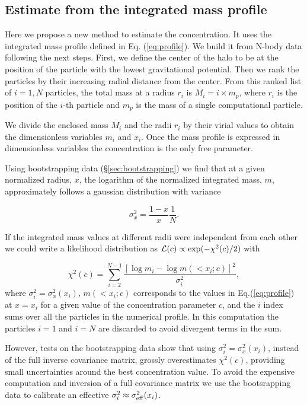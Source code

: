 \documentclass{emulateapj}
\begin{document}
\subsection{Estimate from the integrated mass profile}

Here we propose a new method to estimate the concentration. 
It uses the integrated mass profile defined in
Eq. (\ref{eq:profile}).  We build it from N-body data following the
next steps.  First, we define the center of the halo to be at the
position of the particle with the lowest gravitational potential.
Then we rank the particles by their increasing radial distance from
the center.  From this ranked list of $i=1,N$ particles, the total
mass at a radius $r_i$ is $M_i=i\times m_p$, where $r_i$ is the
position of the $i$-th particle and $m_p$ is the mass of a single
computational particle.

We divide the enclosed mass $M_i$ and the radii $r_i$ by their
virial values to obtain the dimensionless variables $m_i$ and $x_i$.
Once the mass profile is expressed in dimensionless variables the
concentration is the only free parameter.  

Using bootstrapping data (\S \ref{sec:bootstrapping}) we find that at
a given normalized radius, $x$, the logarithm of the normalized
integrated mass, $m$, approximately follows a gaussian distribution
with variance

\begin{equation}
\sigma_x^2 = \frac{1-x}{x}\frac{1}{N}.
\label{eq:sigma}
\end{equation}

If the integrated mass values at different radii were independent from
each other we could write a likelihood distribution as ${\cal
  L}(c)\propto \exp(-\chi^2(c)/2)$ with   

\begin{equation}
\chi^2(c)= \sum_{i=2}^{N-1}\frac{[\log m_i - \log m(< x_i;c)]^2}{\sigma_i^2},
\end{equation}
%
where $\sigma_i^2=\sigma_x^2(x_i)$, $m(<x_i;c)$ corresponds to the
values in Eq.(\ref{eq:profile}) at $x=x_i$ for a given value of the
concentration parameter $c$, and the $i$ index sums over all the
particles in the numerical profile. 
In this computation the particles $i=1$ and $i=N$ are discarded to
avoid divergent terms in the sum.

However, tests on the bootstrapping data show that using
$\sigma_i^2=\sigma_x^2(x_i)$, instead of the full inverse covariance
matrix, grossly overestimates $\chi^2(c)$,
providing small uncertainties around the best concentration value. 
To avoid the expensive computation and inversion of a full covariance
matrix we use the bootsrapping data to calibrate an effective
$\sigma_i^2\approx \sigma_{\rm eff}^2(x_i)$.
\end{document}
